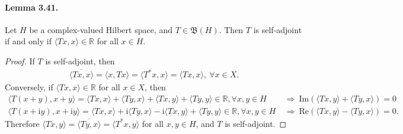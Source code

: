\documentclass{article}
\renewcommand{\Re}{\mathrm{Re}}
\renewcommand{\Im}{\mathrm{Im}}
\renewcommand{\i}{\mathrm{i}}
\begin{document}
\paragraph{Lemma 3.41. \label{lemma:3.41}} Let $H$ be a complex-valued Hilbert space, and $T\in\mathfrak{B}(H)$. Then $T$ is self-adjoint if and only if $\langle Tx,x\rangle\in\mathbb{R}$ for all $x\in H$.
\begin{proof}
If $T$ is self-adjoint, then
\begin{align*}
	\overline{\langle Tx,x\rangle} = \langle x,Tx\rangle = \langle T^*x,x\rangle = \langle Tx,x\rangle,\ \forall x\in X.
\end{align*}
Conversely, if $\langle Tx,x\rangle\in\mathbb{R}$ for all $x\in X$, then
\begin{align*}
	\langle T(x+y),x+y\rangle = \langle Tx,x\rangle + \langle Ty,x\rangle + \langle Tx,y\rangle + \langle Ty,y\rangle \in\mathbb{R}, \forall x,y\in H\ &\Rightarrow\ \Im(\langle Tx,y\rangle + \langle Ty,x\rangle)=0\\
	\langle T(x+\i y),x+\i y\rangle = \langle Tx,x\rangle + \i\langle Ty,x\rangle - \i\langle Tx,y\rangle + \langle Ty,y\rangle \in\mathbb{R}, \forall x,y\in H\  &\Rightarrow\ \Re(\langle Tx,y\rangle - \langle Ty,x\rangle) =0.
\end{align*}
Therefore $\langle Tx,y\rangle = \overline{\langle Ty,x\rangle} = \langle T^*x,y\rangle$ for all $x,y\in H$, and $T$ is self-adjoint.
\end{proof}
\end{document}

